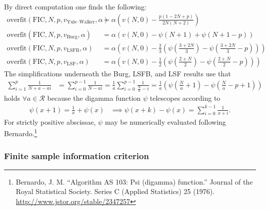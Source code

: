 \documentclass[12pt,letterpaper]{article}
\begin{document}
By direct computation one finds the following:
\begin{subequations}
\begin{align}
    \text{overfit}\!\left(\text{FIC},N,p,v_\text{Yule--Walker},\alpha\right)
    &=
    \alpha\left(
      v\!\left(N,0\right)
    - \frac{p \left(1-2 N+p\right)}{2 N \left(N+2\right)}
    \right)
\\
    \text{overfit}\!\left(\text{FIC},N,p,v_\text{Burg},\alpha\right)
    &=
    \alpha\left(
      v\!\left(N,0\right)
    - \psi\!\left(N+1\right)
    + \psi\!\left(N+1-p\right)
    \right)
\\
    \text{overfit}\!\left(\text{FIC},N,p,v_\text{LSFB},\alpha\right)
    &=
    \alpha\left(
      v\!\left(N,0\right)
    - \frac{2}{3} \left(
            \psi\!\left(\frac{3+2N}{3}\right)
          - \psi\!\left(\frac{3+2N}{3}-p\right)
      \right)
    \right)
\\
    \text{overfit}\!\left(\text{FIC},N,p,v_\text{LSF},\alpha\right)
    &=
    \alpha\left(
      v\!\left(N,0\right)
    - \frac{1}{2} \left(
            \psi\!\left(\frac{2+N}{2}\right)
          - \psi\!\left(\frac{2+N}{2}-p\right)
      \right)
    \right)
\end{align}
\end{subequations}
The simplifications underneath the Burg, LSFB, and LSF results use that
\begin{align}
    \sum_{i=1}^{p} \frac{1}{N+a-ai}
    &=
    \sum_{i=0}^{p-1} \frac{1}{N-ai}
    =
    \frac{1}{a} \sum_{i=0}^{p-1} \frac{1}{\frac{N}{a}-i}
    =
    \frac{1}{a} \left(
          \psi\!\left(\frac{N}{a}+1\right)
        - \psi\!\left(\frac{N}{a}-p+1\right)
    \right)
\end{align}
holds $\forall{}a\in\mathcal{R}$ because the digamma function $\psi$
telescopes according to
\begin{align}
    \psi\!\left(x+1\right)
    =
    \frac{1}{x}
    +
    \psi\!\left(x\right)
    &\implies
    \psi\!\left(x+k\right)
    -
    \psi\!\left(x\right)
    =
    \sum_{i=0}^{k-1} \frac{1}{x + i}
    .
\end{align}
For strictly positive abscissae, $\psi$ may be numerically evaluated following
Bernardo.\footnote{Bernardo, J. M.  ``Algorithm AS 103: Psi (digamma)
function.'' Journal of the Royal Statistical Society.  Series C (Applied
Statistics) 25 (1976).  \url{http://www.jstor.org/stable/2347257}}

\subsubsection*{Finite sample information criterion}
\end{document}
